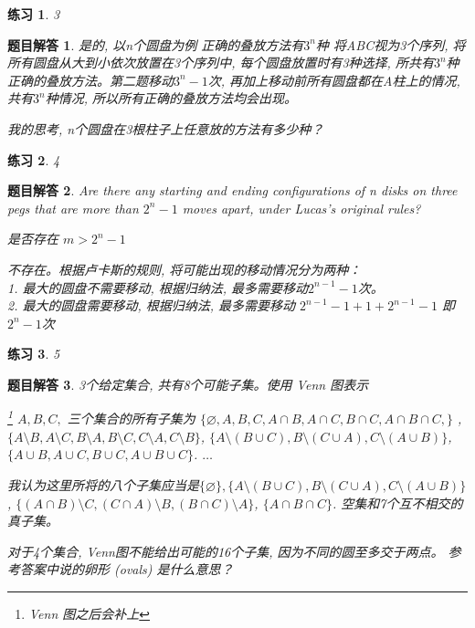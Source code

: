 \documentclass[mode=geye, chinesefont=founder]{elegantnote}
\newtheorem{exercise}{练习}
\newtheorem{answer}{题目解答}
\begin{document}
\begin{exercise}3
\end{exercise}

\begin{answer}
	是的, 以n个圆盘为例
	正确的叠放方法有$ 3^n $种 将ABC视为3个序列, 将所有圆盘从大到小依次放置在3个序列中, 每个圆盘放置时有3种选择, 所共有$ 3^n $种正确的叠放方法。第二题移动$ 3^n-1 $次, 再加上移动前所有圆盘都在A柱上的情况, 共有$ 3^n $种情况, 所以所有正确的叠放方法均会出现。
	
	我的思考, n个圆盘在3根柱子上任意放的方法有多少种？
\end{answer}

\begin{exercise}4
\end{exercise}

\begin{answer}
	Are there any starting and ending configurations of n disks on three pegs
	that are more than $ 2^n - 1 $ moves apart, under Lucas's original rules?
	
	是否存在 $ m > 2^n-1 $
	
	不存在。根据卢卡斯的规则, 将可能出现的移动情况分为两种：\\		
	1. 最大的圆盘不需要移动, 根据归纳法, 最多需要移动$ 2^{n-1}-1 $次。\\	
	2. 最大的圆盘需要移动, 根据归纳法, 最多需要移动 $ 2^{n-1}-1 + 1 + 2^{n-1}-1 $ 即 $  2^{n}-1  $次
\end{answer}

\begin{exercise}5
\end{exercise}

\begin{answer}
	3个给定集合, 共有8个可能子集。使用 Venn 图表示
	
	\footnote{Venn 图之后会补上}
	$ A, B, C, $ 三个集合的所有子集为 $ \{\varnothing, A, B, C, A\cap B, A\cap C, B\cap C, A \cap B \cap C, \} $ , $\{A\setminus B, A\setminus C, B\setminus A, B\setminus C, C\setminus A, C\setminus B \}$, $ \{A\setminus (B\cup C), B\setminus (C\cup A), C\setminus (A\cup B)\} $, $ \{A\cup B, A\cup C, B\cup C, A\cup B\cup C\} $. $ \dots $
	
	我认为这里所将的八个子集应当是$ \{\varnothing\}, \{A\setminus (B\cup C), B\setminus (C\cup A), C\setminus (A\cup B)\} $, $ \{(A\cap B)\setminus C, (C\cap A)\setminus B, (B\cap C)\setminus A \} $, $ \{A\cap B\cap C\} $. 空集和7个互不相交的真子集。
	
	对于4个集合, Venn图不能给出可能的16个子集, 因为不同的圆至多交于两点。 参考答案中说的卵形 (ovals) 是什么意思？
\end{answer}
\end{document}
